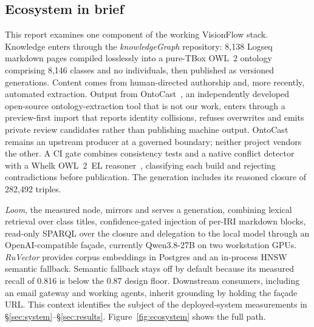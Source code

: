 \documentclass[10pt,twocolumn]{article}
\begin{document}
\subsection{Ecosystem in brief}\label{sec:ecosystem}
This report examines one component of the working VisionFlow stack. Knowledge enters through the \emph{knowledgeGraph} repository: 8{,}138 Logseq markdown pages compiled losslessly into a pure-TBox OWL~2 ontology comprising 8{,}146 classes and no individuals, then published as versioned generations. Content comes from human-directed authorship and, more recently, automated extraction. Output from OntoCast~\cite{ontocast}, an independently developed open-source ontology-extraction tool that is not our work, enters through a preview-first import that reports identity collisions, refuses overwrites and emits private review candidates rather than publishing machine output. OntoCast remains an upstream producer at a governed boundary; neither project vendors the other. A CI gate combines consistency tests and a native conflict detector with a Whelk OWL~2~EL reasoner~\cite{whelk}, classifying each build and rejecting contradictions before publication. The generation includes its reasoned closure of 282{,}492 triples.

\emph{Loom}, the measured node, mirrors and serves a generation, combining lexical retrieval over class titles, confidence-gated injection of per-IRI markdown blocks, read-only SPARQL over the closure and delegation to the local model through an OpenAI-compatible fa\c{c}ade, currently Qwen3.8-27B on two workstation GPUs. \emph{RuVector} provides corpus embeddings in Postgres and an in-process HNSW semantic fallback. Semantic fallback stays off by default because its measured recall of 0.816 is below the 0.87 design floor. Downstream consumers, including an email gateway and working agents, inherit grounding by holding the fa\c{c}ade URL. This context identifies the subject of the deployed-system measurements in \S\ref{sec:system}--\S\ref{sec:results}. Figure~\ref{fig:ecosystem} shows the full path.


\end{document}
